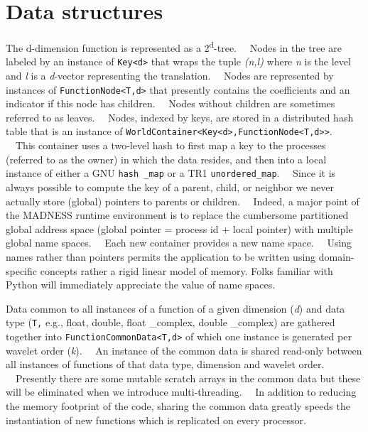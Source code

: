 \documentclass[letterpaper]{book}
\begin{document}
\section[Data structures]{Data structures}
The d-dimension function is represented as a 2\textsuperscript{d}{}-tree. \ \ Nodes in the tree are labeled by an
instance of \texttt{Key{\textless}d{\textgreater}} that wraps the tuple \textit{(n,l)} where \textit{n} is the level
and \textit{l} is a \textit{d}{}-vector representing the translation. \ \ Nodes are represented by instances of
\texttt{FunctionNode{\textless}T,d{\textgreater}} that presently contains the coefficients and an indicator if this
node has children. \ \ Nodes without children are sometimes referred to as leaves. \ \ Nodes, indexed by keys, are
stored in a distributed hash table that is an instance of
\texttt{WorldContainer{\textless}Key{\textless}d{\textgreater},FunctionNode{\textless}T,d{\textgreater}{\textgreater}}.
\ \ This container uses a two-level hash to first map a key to the processes (referred to as the owner) in which the
data resides, and then into a local instance of either a GNU \texttt{hash \_map} or a TR1 \texttt{unordered\_map}.
\ \ Since it is always possible to compute the key of a parent, child, or neighbor we never actually store (global)
pointers to parents or children. \ \ Indeed, a major point of the MADNESS runtime environment is to replace the
cumbersome partitioned global address space (global pointer = process id + local pointer) with multiple global name
spaces. \ \ Each new container provides a new name space. \ \ Using names rather than pointers permits the application
to be written using domain-specific concepts rather a rigid linear model of memory. Folks familiar with Python will
immediately appreciate the value of name spaces.

Data common to all instances of a function of a given dimension (\textit{d}) and data type (\texttt{T,} e.g., float,
double, float \_complex, double \_complex) are gathered together into
\texttt{FunctionCommonData{\textless}T,d{\textgreater}} of which one instance is generated per wavelet order
(\textit{k}). \ \ An instance of the common data is shared read-only between all instances of functions of that data
type, dimension and wavelet order. \ \ Presently there are some mutable scratch arrays in the common data but these
will be eliminated when we introduce multi-threading. \ \ In addition to reducing the memory footprint of the code,
sharing the common data greatly speeds the instantiation of new functions which is replicated on every processor.
\end{document}
